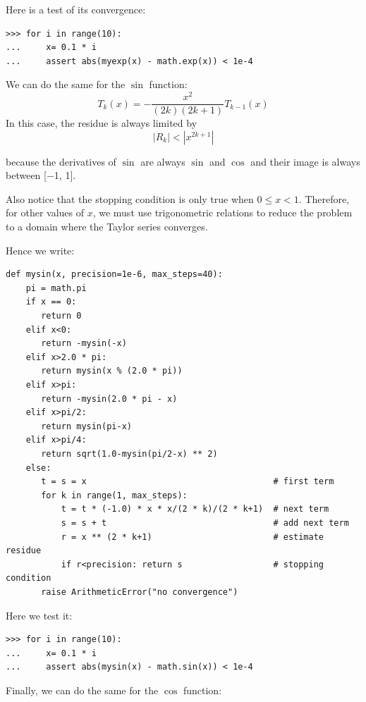 \documentclass[justified, sixbynine]{tufte-book}
\def\ft{\small\tt}
\theoremstyle{plain}%
\newtheorem * {corollary}{Corollary}
\theoremstyle{definition}
\theoremstyle{remark}
\newtheorem * {remark}{Remark}
\newtheorem * {note}{Note}
\begin{document}
\begin{fullwidth}
Here is a test of its convergence:

\begin{lstlisting}[caption={in file: {\ft nlib.py}}]
>>> for i in range(10):
...     x= 0.1 * i
...     assert abs(myexp(x) - math.exp(x)) < 1e-4
\end{lstlisting}

We can do the same for the $\sin$ function:
\begin{equation}
T_k(x) = -\frac{x^2}{(2k)(2k+1)}T_{k-1}(x)
\end{equation}
In this case, the residue is always limited by
\begin{equation}
|R_k| < |x^{2k+1}|
\end{equation}

because the derivatives of $\sin$ are always $\sin$ and $\cos$ and their image is always between [$-$1, 1].

Also notice that the stopping condition is only true when $0\leq x<1$. Therefore, for other values of $x$, we must use trigonometric relations to reduce the problem to a domain where the Taylor series converges.

Hence we write:

\begin{lstlisting}[caption={in file: {\ft nlib.py}}]
def mysin(x, precision=1e-6, max_steps=40):
    pi = math.pi
    if x == 0:
       return 0
    elif x<0:
       return -mysin(-x)
    elif x>2.0 * pi:
       return mysin(x % (2.0 * pi))
    elif x>pi:
       return -mysin(2.0 * pi - x)
    elif x>pi/2:
       return mysin(pi-x)
    elif x>pi/4:
       return sqrt(1.0-mysin(pi/2-x) ** 2)
    else:
       t = s = x                                     # first term
       for k in range(1, max_steps):
           t = t * (-1.0) * x * x/(2 * k)/(2 * k+1)  # next term
           s = s + t                                 # add next term
           r = x ** (2 * k+1)                        # estimate residue
           if r<precision: return s                  # stopping condition
       raise ArithmeticError("no convergence")
\end{lstlisting}

Here we test it:
\begin{lstlisting}[caption={in file: {\ft nlib.py}}]
>>> for i in range(10):
...     x= 0.1 * i
...     assert abs(mysin(x) - math.sin(x)) < 1e-4
\end{lstlisting}

Finally, we can do the same for the $\cos$ function:


\end{fullwidth}
\end{document}

